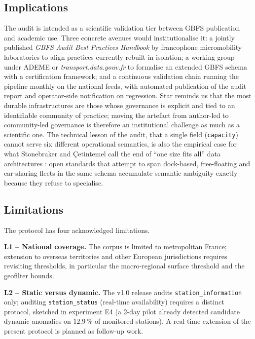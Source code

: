 \documentclass[11pt,a4paper]{article}
\begin{document}
\subsection{Implications}
The audit is intended as a scientific validation tier between GBFS
publication and academic use. Three concrete avenues would
institutionalise it: a jointly published \emph{GBFS Audit Best
Practices Handbook} by francophone micromobility laboratories to
align practices currently rebuilt in isolation; a working group
under ADEME or \emph{transport.data.gouv.fr} to formalise an
extended GBFS schema with a certification framework; and a
continuous validation chain running the pipeline monthly on the
national feeds, with automated publication of the audit report and
operator-side notification on regression. Star \cite{Star2010}
reminds us that the most durable infrastructures are those whose
governance is explicit and tied to an identifiable community of
practice; moving the artefact from author-led to community-led
governance is therefore an institutional challenge as much as a
scientific one. The technical lesson of the audit, that a single
field (\texttt{capacity}) cannot serve six different operational
semantics, is also the empirical case for what Stonebraker and
\c{C}etintemel \cite{Stonebraker2005OneSize} call the end of
``one size fits all'' data architectures : open standards that
attempt to span dock-based, free-floating and car-sharing fleets in
the same schema accumulate semantic ambiguity exactly because they
refuse to specialise.

\subsection{Limitations}\label{secLimitations}
The protocol has four acknowledged limitations.

\textbf{L1 -- National coverage.} The corpus is limited to metropolitan
France; extension to overseas territories and other European
jurisdictions requires revisiting thresholds, in particular the
macro-regional surface threshold and the geofilter bounds.

\textbf{L2 -- Static versus dynamic.} The v1.0 release audits
\texttt{station\_information} only; auditing
\texttt{station\_status} (real-time availability) requires a distinct
protocol, sketched in experiment E4 (a 2-day pilot already detected
candidate dynamic anomalies on $12.9\,\%$ of monitored stations).
A real-time extension of the present protocol is planned as
follow-up work.
\end{document}
